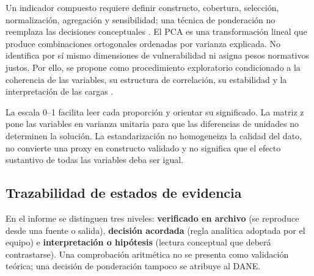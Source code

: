 Un indicador compuesto requiere definir constructo, cobertura, selección, normalización, agregación y sensibilidad; una técnica de ponderación no reemplaza las decisiones conceptuales \citep{booysen2002overview,oecd2008composite}. El PCA es una transformación lineal que produce combinaciones ortogonales ordenadas por varianza explicada. No identifica por sí mismo dimensiones de vulnerabilidad ni asigna pesos normativos justos. Por ello, se propone como procedimiento exploratorio condicionado a la coherencia de las variables, su estructura de correlación, su estabilidad y la interpretación de las cargas \citep{jolliffe2002principal,abdi2010principal}.

La escala 0--1 facilita leer cada proporción y orientar su significado. La matriz z pone las variables en varianza unitaria para que las diferencias de unidades no determinen la solución. La estandarización no homogeneiza la calidad del dato, no convierte una proxy en constructo validado y no significa que el efecto sustantivo de todas las variables deba ser igual.

\subsection{Trazabilidad de estados de evidencia}

En el informe se distinguen tres niveles: \textbf{verificado en archivo} (se reproduce desde una fuente o salida), \textbf{decisión acordada} (regla analítica adoptada por el equipo) e \textbf{interpretación o hipótesis} (lectura conceptual que deberá contrastarse). Una comprobación aritmética no se presenta como validación teórica; una decisión de ponderación tampoco se atribuye al DANE.

